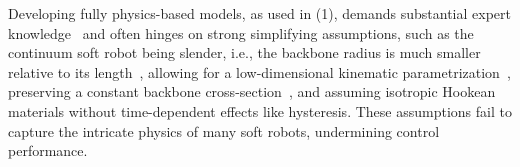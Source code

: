 Developing fully physics-based models, as used in (1), demands substantial expert knowledge~\citep{stella2023science} and often hinges on strong simplifying assumptions, such as the continuum soft robot being slender, i.e., the backbone radius is much smaller relative to its length~\citep{cosserat1909theorie}, allowing for a low-dimensional kinematic parametrization~\citep{armanini2023soft}, preserving a constant backbone cross-section~\citep{gazzola2018forward}, and assuming isotropic Hookean materials without time-dependent effects like hysteresis. These assumptions fail to capture the intricate physics of many soft robots, undermining control performance. 
